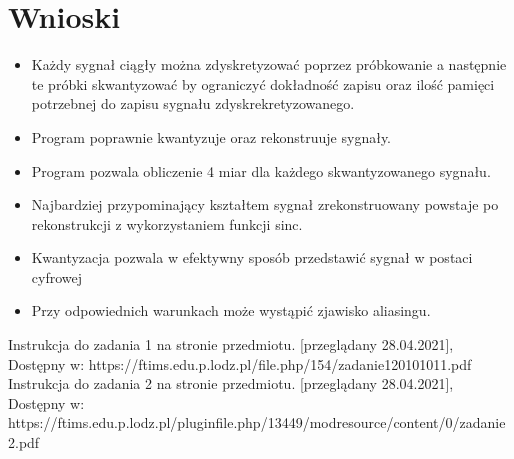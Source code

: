 \documentclass[12pt]{article}
\begin{document}

\section{Wnioski}
\begin{itemize}
    \item Każdy sygnał ciągły można zdyskretyzować poprzez próbkowanie a następnie te próbki skwantyzować by ograniczyć dokładność zapisu oraz ilość pamięci potrzebnej do zapisu sygnału zdyskrekretyzowanego.
    \item Program poprawnie kwantyzuje oraz rekonstruuje sygnały.
    \item Program pozwala obliczenie 4 miar dla każdego skwantyzowanego sygnału.
    \item Najbardziej przypominający kształtem sygnał zrekonstruowany powstaje po rekonstrukcji z wykorzystaniem funkcji sinc.
    \item Kwantyzacja pozwala w efektywny sposób przedstawić sygnał w postaci cyfrowej
    \item Przy odpowiednich warunkach może wystąpić zjawisko aliasingu.
\end{itemize}
 

\begin{thebibliography}{}
 Instrukcja do zadania 1 na stronie przedmiotu. [przeglądany 28.04.2021], Dostępny w: https://ftims.edu.p.lodz.pl/file.php/154/zadanie120101011.pdf
 Instrukcja do zadania 2 na stronie przedmiotu. [przeglądany 28.04.2021], Dostępny w: {https://ftims.edu.p.lodz.pl/pluginfile.php/13449/modresource/content/0/zadanie2.pdf}

\end{thebibliography}
\end{document}
